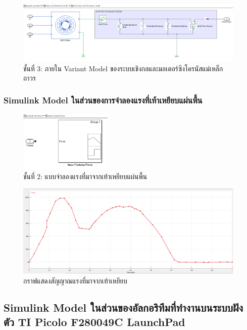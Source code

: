 \documentclass[11pt,a4paper]{article}
\begin{document}
\begin{figure}[H]
    \centering
    \includegraphics[width=\textwidth]{l4-genpath-bldc.png}
    \caption{ชั้นที่ 3: ภายใน Variant Model ของระบบเชิงกลและมอเตอร์ซิงโครนัสแม่เหล็กถาวร}
\end{figure}

\subsubsection{Simulink Model ในส่วนของการจำลองแรงที่เท้าเหยียบแผ่นพื้น}

\begin{figure}[H]
    \centering
    \includegraphics[width=0.4\textwidth]{l2-footstep-force.png}
    \caption{ชั้นที่ 2: แบบจำลองแรงที่มาจากเท้าเหยียบแผ่นพื้น}
\end{figure}

\begin{figure}[H]
    \centering
    \includegraphics[width=\textwidth]{footstepsignal.png}
    \caption{กราฟแสดงสัญญาณแรงที่มาจากเท้าเหยียบ}
\end{figure}

\subsection{Simulink Model ในส่วนของอัลกอริทึมที่ทำงานบนระบบฝังตัว TI Picolo F280049C LaunchPad}
\end{document}
